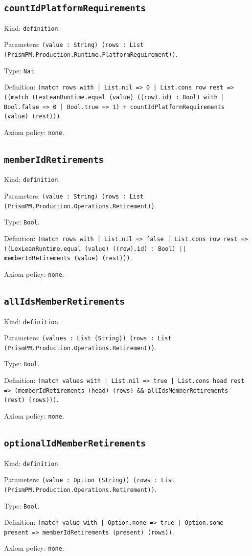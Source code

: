 \documentclass[11pt]{article}
\begin{document}
\subsection*{\texttt{countIdPlatformRequirements}}
\noindent Kind: \texttt{definition}.\par
\noindent Parameters: \texttt{(value : String) (rows : List (PrismPM.Production.Runtime.PlatformRequirement))}.\par
\noindent Type: \texttt{Nat}.\par
\noindent Definition: \texttt{(match rows with | List.nil => 0 | List.cons row rest => ((match (LexLeanRuntime.equal (value) ((row).id) : Bool) with | Bool.false => 0 | Bool.true => 1) + countIdPlatformRequirements (value) (rest)))}.\par
\noindent Axiom policy: \texttt{none}.\par
\subsection*{\texttt{memberIdRetirements}}
\noindent Kind: \texttt{definition}.\par
\noindent Parameters: \texttt{(value : String) (rows : List (PrismPM.Production.Operations.Retirement))}.\par
\noindent Type: \texttt{Bool}.\par
\noindent Definition: \texttt{(match rows with | List.nil => false | List.cons row rest => ((LexLeanRuntime.equal (value) ((row).id) : Bool) || memberIdRetirements (value) (rest)))}.\par
\noindent Axiom policy: \texttt{none}.\par
\subsection*{\texttt{allIdsMemberRetirements}}
\noindent Kind: \texttt{definition}.\par
\noindent Parameters: \texttt{(values : List (String)) (rows : List (PrismPM.Production.Operations.Retirement))}.\par
\noindent Type: \texttt{Bool}.\par
\noindent Definition: \texttt{(match values with | List.nil => true | List.cons head rest => (memberIdRetirements (head) (rows) \&\& allIdsMemberRetirements (rest) (rows)))}.\par
\noindent Axiom policy: \texttt{none}.\par
\subsection*{\texttt{optionalIdMemberRetirements}}
\noindent Kind: \texttt{definition}.\par
\noindent Parameters: \texttt{(value : Option (String)) (rows : List (PrismPM.Production.Operations.Retirement))}.\par
\noindent Type: \texttt{Bool}.\par
\noindent Definition: \texttt{(match value with | Option.none => true | Option.some present => memberIdRetirements (present) (rows))}.\par
\noindent Axiom policy: \texttt{none}.\par
\end{document}
